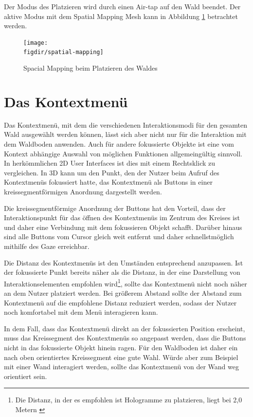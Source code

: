 Der Modus des Platzieren wird durch einen Air-tap auf den Wald beendet. Der aktive Modus mit dem Spatial Mapping Mesh kann in Abbildung \ref{fig:spatial-mapping} betrachtet werden.

\begin{figure}[htb]
  \texttt{[image: \\figdir/spatial-mapping]}
  \caption{Spacial Mapping beim Platzieren des Waldes}
  \label{fig:spatial-mapping}
\end{figure}

\section{Das Kontextmenü}
Das Kontextmenü, mit dem die verschiedenen Interaktionsmodi für den gesamten Wald ausgewählt werden können, lässt sich aber nicht nur für die Interaktion mit dem Waldboden anwenden. Auch für andere fokussierte Objekte ist eine vom Kontext abhängige Auswahl von möglichen Funktionen allgemeingültig sinnvoll. In herkömmlichen 2D User Interfaces ist dies mit einem Rechtsklick zu vergleichen. In 3D kann um den Punkt, den der Nutzer beim Aufruf des Kontextmenüs fokussiert hatte, das Kontextmenü als Buttons in einer kreissegmentförmigen Anordnung dargestellt werden.

Die kreissegmentförmige Anordnung der Buttons hat den Vorteil, dass der Interaktionspunkt für das öffnen des Kontextmenüs im Zentrum des Kreises ist und daher eine Verbindung mit dem fokussieren Objekt schafft. Darüber hinaus sind alle Buttons vom Cursor gleich weit entfernt und daher schnellstmöglich mithilfe des Gaze erreichbar.

Die Distanz des Kontextmenüs ist den Umständen entsprechend anzupassen. Ist der fokussierte Punkt bereits näher als die Distanz, in der eine Darstellung von Interaktionselementen empfohlen wird\footnote{Die Distanz, in der es empfohlen ist Hologramme zu platzieren, liegt bei 2,0 Metern \cite{windows2017interaction}}, sollte das Kontextmenü nicht noch näher an dem Nutzer platziert werden. Bei größerem Abstand sollte der Abstand zum Kontextmenü auf die empfohlene Distanz reduziert werden, sodass der Nutzer noch komfortabel mit dem Menü interagieren kann.

In dem Fall, dass das Kontextmenü direkt an der fokussierten Position erscheint, muss das Kreissegment des Kontextmenüs so angepasst werden, dass die Buttons nicht in das fokussierte Objekt hinein ragen. Für den Waldboden ist daher ein nach oben orientiertes Kreissegment eine gute Wahl. Würde aber zum Beispiel mit einer Wand interagiert werden, sollte das Kontextmenü von der Wand weg orientiert sein.

